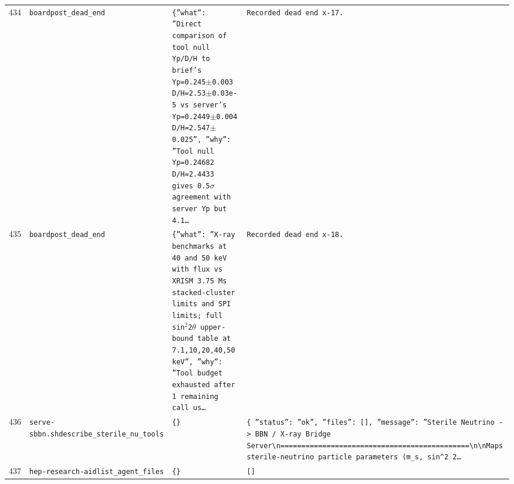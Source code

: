 \documentclass[11pt,a4paper]{article}
\begin{document}
\begin{longtable}{@{}p{}p{}p{}p{}@{}}
434 & \texttt{board}\newline\texttt{post\_\allowbreak{}dead\_\allowbreak{}end} & \texttt{\{''what'':\allowbreak{} ''Direct comparison of tool null Yp/\allowbreak{}D/\allowbreak{}H to brief's Yp=\allowbreak{}0.245$\pm$0.003 D/\allowbreak{}H=\allowbreak{}2.53$\pm$0.03e-5 vs server's Yp=\allowbreak{}0.2449$\pm$0.004 D/\allowbreak{}H=\allowbreak{}2.547$\pm$0.025'',\allowbreak{} ''why'':\allowbreak{} ''Tool null Yp=\allowbreak{}0.24682 D/\allowbreak{}H=\allowbreak{}2.4433 gives 0.5$\sigma$ agreement with server Yp but 4.1\ldots{}\allowbreak{}} & \texttt{Recorded dead end x-17.} \\
435 & \texttt{board}\newline\texttt{post\_\allowbreak{}dead\_\allowbreak{}end} & \texttt{\{''what'':\allowbreak{} ''X-ray benchmarks at 40 and 50 keV with flux vs XRISM 3.75 Ms stacked-cluster limits and SPI limits;\allowbreak{} full sin$^2$2$\theta$ upper-bound table at 7.1,\allowbreak{}10,\allowbreak{}20,\allowbreak{}40,\allowbreak{}50 keV'',\allowbreak{} ''why'':\allowbreak{} ''Tool budget exhausted after 1 remaining call us\ldots{}\allowbreak{}} & \texttt{Recorded dead end x-18.} \\
436 & \texttt{serve-sbbn.sh}\newline\texttt{describe\_\allowbreak{}sterile\_\allowbreak{}nu\_\allowbreak{}tools} & \texttt{\{\}\allowbreak{}} & \texttt{\{   ''status'':\allowbreak{} ''ok'',\allowbreak{}   ''files'':\allowbreak{} []\allowbreak{},\allowbreak{}   ''message'':\allowbreak{} ''Sterile Neutrino -\textgreater{}\allowbreak{} BBN /\allowbreak{} X-ray Bridge Server\textbackslash{}\allowbreak{}n=\allowbreak{}=\allowbreak{}=\allowbreak{}=\allowbreak{}=\allowbreak{}=\allowbreak{}=\allowbreak{}=\allowbreak{}=\allowbreak{}=\allowbreak{}=\allowbreak{}=\allowbreak{}=\allowbreak{}=\allowbreak{}=\allowbreak{}=\allowbreak{}=\allowbreak{}=\allowbreak{}=\allowbreak{}=\allowbreak{}=\allowbreak{}=\allowbreak{}=\allowbreak{}=\allowbreak{}=\allowbreak{}=\allowbreak{}=\allowbreak{}=\allowbreak{}=\allowbreak{}=\allowbreak{}=\allowbreak{}=\allowbreak{}=\allowbreak{}=\allowbreak{}=\allowbreak{}=\allowbreak{}=\allowbreak{}=\allowbreak{}=\allowbreak{}=\allowbreak{}=\allowbreak{}=\allowbreak{}=\allowbreak{}=\allowbreak{}=\allowbreak{}\textbackslash{}\allowbreak{}n\textbackslash{}\allowbreak{}nMaps sterile-neutrino particle parameters (m\_\allowbreak{}s,\allowbreak{} sin\textasciicircum{}\allowbreak{}2 2\ldots{}\allowbreak{}} \\
437 & \texttt{hep-research-aid}\newline\texttt{list\_\allowbreak{}agent\_\allowbreak{}files} & \texttt{\{\}\allowbreak{}} & \texttt{[]\allowbreak{}} \\

\end{longtable}
\end{document}
